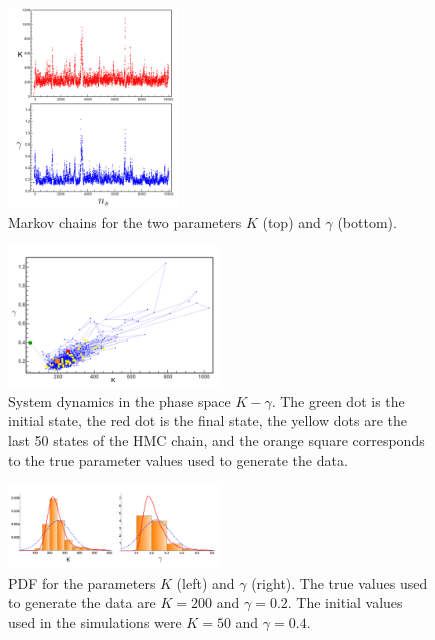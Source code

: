 \documentclass[12pt,a4paper,final]{iopart}
\begin{document}
\begin{figure}[htb!]
    \centering
    \includegraphics[width=0.4\textwidth]{Figs/FigChains.png}
    \caption{Markov chains for the two parameters $K$ (top) and $\gamma$ (bottom).}
    \label{fig:chains}
\end{figure}

\begin{figure}[htb!]
    \centering
    \includegraphics[width=0.5\textwidth]{Figs/FigPhaseSpaceEvol.png}
    \caption{System dynamics in the phase space $K-\gamma$. The green dot is the initial state, the red dot is the final state, the yellow dots are the last 50 states of the HMC chain, and the orange square corresponds to the true parameter values used to generate the data.}
    \label{fig:phase_space_evol}
\end{figure}

\begin{figure}[htb!]
    \centering
    \includegraphics[width=0.5\textwidth]{Figs/FigKg.png}
    \caption{PDF for the parameters $K$ (left) and $\gamma$ (right). The true values used to generate the data are $K=200$ and $\gamma = 0.2$. The initial values used in the simulations were $K=50$ and $\gamma = 0.4$.}
    \label{fig:K_distr}
\end{figure}
\end{document}
